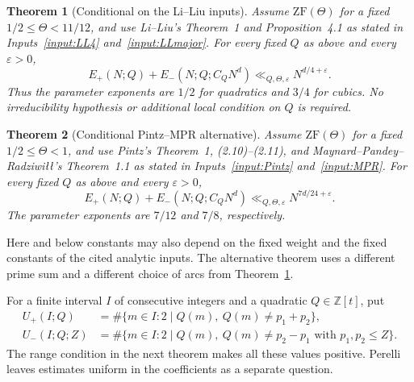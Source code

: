 \documentclass[11pt]{article}
\newtheorem{theorem}{Theorem}[section]
\theoremstyle{definition}
\theoremstyle{remark}
\numberwithin{equation}{section}
\newcommand{\eps}{\varepsilon}
\newcommand{\Z}{\mathbb Z}
\begin{document}
\begin{theorem}[Conditional on the Li--Liu inputs]\label{thm:fixed}
Assume $\mathrm{ZF}(\Theta)$ for a fixed $1/2\le\Theta<11/12$,
and use Li--Liu's Theorem~1 and Proposition~4.1 as stated in
Inputs~\ref{input:LL4} and~\ref{input:LLmajor}.
For every fixed $Q$ as above and every $\eps>0$,
\begin{equation}\label{eq:main}
 E_+(N;Q)+E_-(N;Q;C_QN^d)
       \ll_{Q,\Theta,\eps} N^{d/4+\eps}.
\end{equation}
Thus the parameter exponents are $1/2$ for quadratics and $3/4$ for
cubics. No irreducibility hypothesis or additional local condition
on $Q$ is required.
\end{theorem}

\begin{theorem}[Conditional Pintz--MPR alternative]\label{thm:fallback}
Assume $\mathrm{ZF}(\Theta)$ for a fixed $1/2\le\Theta<1$,
and use Pintz's Theorem~1, (2.10)--(2.11), and
Maynard--Pandey--Radziwi\l\l's Theorem~1.1 as stated in
Inputs~\ref{input:Pintz} and~\ref{input:MPR}.
For every fixed $Q$ as above and every $\eps>0$,
\begin{equation}\label{eq:fallback}
 E_+(N;Q)+E_-(N;Q;C_QN^d)
       \ll_{Q,\Theta,\eps} N^{7d/24+\eps}.
\end{equation}
The parameter exponents are $7/12$ and $7/8$, respectively.
\end{theorem}

Here and below constants may also depend on the fixed weight and the
fixed constants of the cited analytic inputs. The alternative theorem
uses a different prime sum and a different choice of arcs from
Theorem~\ref{thm:fixed}.

For a finite interval $I$ of consecutive integers and a quadratic
$Q\in\Z[t]$, put
\begin{align*}
 U_+(I;Q)&=\#\{m\in I:2\mid Q(m),\ Q(m)\ne p_1+p_2\},\\
 U_-(I;Q;Z)&=\#\{m\in I:2\mid Q(m),\ Q(m)\ne p_2-p_1
                                      \text{ with }p_1,p_2\le Z\}.
\end{align*}
The range condition in the next theorem makes all these values positive.
Perelli \cite[p.~478]{Perelli} leaves estimates uniform in the coefficients
as a separate question.
\end{document}
